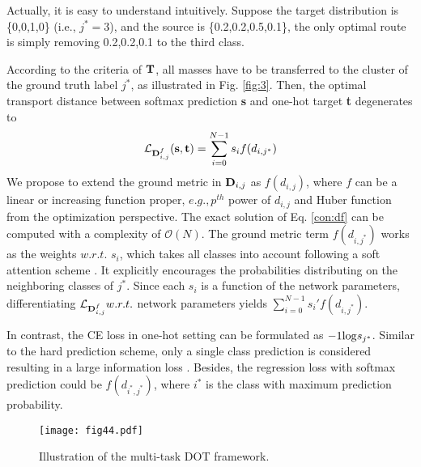 \documentclass{article}
\theoremstyle{plain}%
\begin{document}
Actually, it is easy to understand intuitively. Suppose the target distribution is \{0,0,1,0\} (i.e., $j^*=3$), and the source is \{0.2,0.2,0.5,0.1\}, the only optimal route is simply removing 0.2,0.2,0.1 to the third class.    

According to the criteria of ${\rm \textbf{T}}$, all masses have to be transferred to the cluster of the ground truth label $j^*$, as illustrated in Fig. \ref{fig:3}. Then, the optimal transport distance between softmax prediction {\rm{\textbf{s}}} and one-hot target {\rm{\textbf{t}}} degenerates to\begin{equation}
\mathcal{L}_{{\rm\textbf{D}}_{i,j}^{f}}({\rm{\textbf{s},\textbf{t}}})=\sum_{i=0}^{N-1} s_i f(d_{i,j^*}) \label{con:df}
\end{equation} We propose to extend the ground metric in ${\rm\textbf{D}}_{i,j}$ as $f(d_{i,j})$, where $f$ can be a linear or increasing function proper, $e.g., p^{th}$ power of $d_{i,j}$ and Huber function from the optimization perspective. The exact solution of Eq. \eqref{con:df} can be computed with a complexity of $\mathcal{O}(N)$. The ground metric term $f(d_{i,j^*})$ works as the weights $w.r.t.$ $s_i$, which takes all classes into account following a soft attention scheme \cite{liu2018dependency}. It explicitly encourages the probabilities distributing on the neighboring classes of $j^*$. Since each $s_i$ is a function of the network parameters, differentiating $\mathcal{L}_{{\rm\textbf{D}}_{i,j}^{f}} w.r.t.$ network parameters yields $\sum_{i=0}^{N-1}s_i'f(d_{i,j^*})$.    




In contrast, the CE loss in one-hot setting can be formulated as $-1{\rm log}s_{j^*}$. Similar to the hard prediction scheme, only a single class prediction is considered resulting in a large information loss \cite{liu2018dependency}. Besides, the regression loss with softmax prediction could be $f(d_{i^*,j^*})$, where $i^*$ is the class with maximum prediction probability.




\begin{figure}[t!]
\texttt{[image: fig44.pdf]} 
\caption{Illustration of the multi-task DOT framework.} 
\label{fig:44}
\end{figure}




 

 
\end{document}
